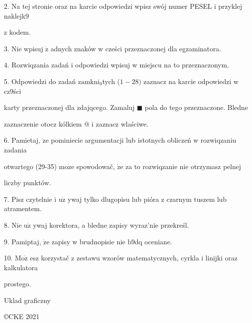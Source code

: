 \documentclass[a4paper,12pt]{article}
\begin{document}
2. Na tej stronie oraz na karcie odpowiedzi wpisz swój numer PESEL i przyklej naklejk9

z kodem.

3. Nie wpisuj $\dot{\mathrm{z}}$ adnych znaków w cześci przeznaczonej dla egzaminatora.

4. Rozwiqzania zadań i odpowiedzi wpisuj w miejscu na to przeznaczonym.

5. Odpowiedzi do zadań $\mathrm{z}\mathrm{a}\mathrm{m}\mathrm{k}\mathrm{n}\mathrm{i}_{9}$tych ($1-28)$ zaznacz na karcie odpowiedzi w cz9ści

karty przeznaczonej dla zdajqcego. Zamaluj $\blacksquare$ pola do tego przeznaczone. Bledne

zaznaczenie otocz kólkiem @ i zaznacz wlaściwe.

6. Pamietaj, $\dot{\mathrm{z}}\mathrm{e}$ pominiecie argumentacji lub istotnych obliczeń w rozwiqzaniu zadania

otwartego (29-35) $\mathrm{m}\mathrm{o}\dot{\mathrm{z}}\mathrm{e}$ spowodowač, $\dot{\mathrm{z}}\mathrm{e}$ za to rozwiqzanie nie otrzymasz pelnej

liczby punktów.

7. Pisz czytelnie i $\mathrm{u}\dot{\mathrm{z}}$ ywaj tylko dlugopisu lub pióra z czarnym tuszem lub atramentem.

8. Nie $\mathrm{u}\dot{\mathrm{z}}$ ywaj korektora, a bledne zapisy wyraz'nie przekreśl.

9. Pamiptaj, $\dot{\mathrm{z}}\mathrm{e}$ zapisy w brudnopisie nie $\mathrm{b}9\mathrm{d}\mathrm{q}$ oceniane.

10. $\mathrm{M}\mathrm{o}\dot{\mathrm{z}}$ esz korzystač z zestawu wzorów matematycznych, cyrkla i linijki oraz kalkulatora

prostego.

Uklad graficzny

\copyright CKE 2021
\end{document}
